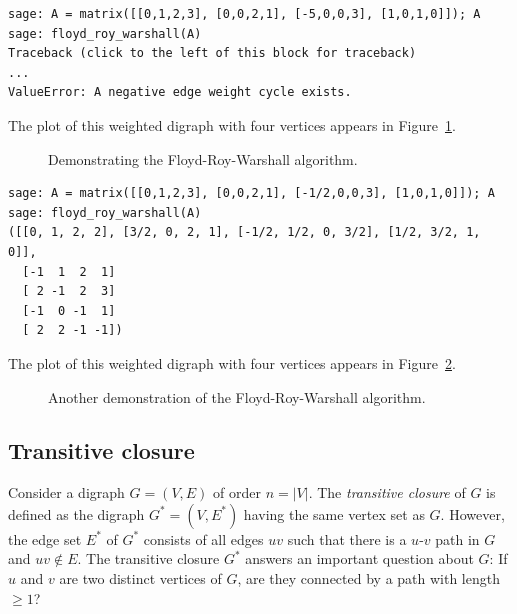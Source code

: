 \begin{lstlisting}
sage: A = matrix([[0,1,2,3], [0,0,2,1], [-5,0,0,3], [1,0,1,0]]); A
sage: floyd_roy_warshall(A)
Traceback (click to the left of this block for traceback)
...
ValueError: A negative edge weight cycle exists.
\end{lstlisting}

The plot of this weighted digraph with four vertices appears in
Figure~\ref{fig:graph_algorithms:Floyd_Roy_Warshall_demo}.

\begin{figure}[!htbp]
\centering
{}

\caption{Demonstrating the Floyd-Roy-Warshall algorithm.}
\label{fig:graph_algorithms:Floyd_Roy_Warshall_demo}
\end{figure}

\begin{lstlisting}
sage: A = matrix([[0,1,2,3], [0,0,2,1], [-1/2,0,0,3], [1,0,1,0]]); A
sage: floyd_roy_warshall(A)
([[0, 1, 2, 2], [3/2, 0, 2, 1], [-1/2, 1/2, 0, 3/2], [1/2, 3/2, 1, 0]],
  [-1  1  2  1]
  [ 2 -1  2  3]
  [-1  0 -1  1]
  [ 2  2 -1 -1])
\end{lstlisting}

The plot of this weighted digraph with four vertices appears in
Figure~\ref{fig:graph_algorithms:another_Floyd_Roy_Warshall_demo}.

\begin{figure}[!htbp]
\centering

\caption{Another demonstration of the Floyd-Roy-Warshall algorithm.}
\label{fig:graph_algorithms:another_Floyd_Roy_Warshall_demo}
\end{figure}



\subsection{Transitive closure}

Consider a digraph $G = (V, E)$ of order $n = |V|$. The
\emph{transitive closure} of $G$ is defined
as the digraph $G^* = (V, E^*)$ having the same vertex set as
$G$. However, the edge set $E^*$ of $G^*$ consists of all edges $uv$
such that there is a $u$-$v$ path in $G$ and $uv \notin E$. The
transitive closure $G^*$ answers an important question about $G$: If
$u$ and $v$ are two distinct vertices of $G$, are they connected by a
path with length $\geq 1$?


